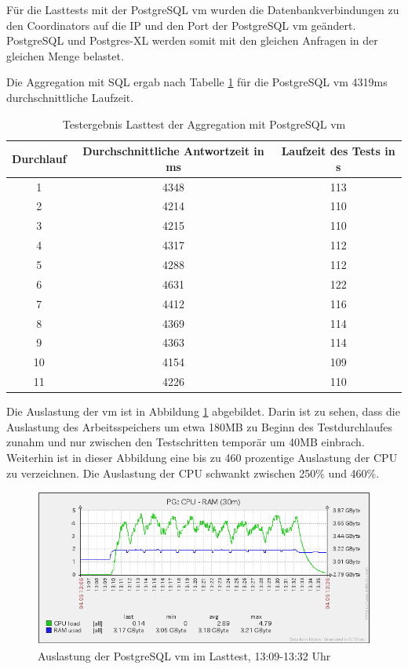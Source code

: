 Für die Lasttests mit der PostgreSQL \Gls{vm} wurden die Datenbankverbindungen zu den Coordinators auf die IP und den Port der PostgreSQL \Gls{vm} geändert.
PostgreSQL und Postgres-XL werden somit mit den gleichen Anfragen in der gleichen Menge belastet.

Die Aggregation mit SQL ergab nach Tabelle \ref{tbl:ergebnisseTest1PG} für die PostgreSQL \Gls{vm} 4319ms durchschnittliche Laufzeit.
\begin{table}[h!]
\centering
\begin{tabular}{c|c|c}
\textbf{Durchlauf} & \textbf{Durchschnittliche Antwortzeit in ms} & \textbf{Laufzeit des Tests in s} \\ \hline
1 & 4348 & 113 \\ \hline
2 & 4214 & 110 \\ \hline
3 & 4215 & 110 \\ \hline
4 & 4317 & 112 \\ \hline
5 & 4288 & 112 \\ \hline 
6 & 4631 & 122 \\ \hline
7 & 4412 & 116 \\ \hline
8 & 4369 & 114 \\ \hline
9 & 4363 & 114 \\ \hline 
10 & 4154 & 109 \\ \hline
11 & 4226 & 110 \\	
\end{tabular}
\caption[Testergebnis Lasttest der Aggregation mit PostgreSQL \Gls{vm}]{Testergebnis Lasttest der Aggregation mit PostgreSQL \Gls{vm}}
\label{tbl:ergebnisseTest1PG}
\end{table}

Die Auslastung der \Gls{vm} ist in Abbildung \ref{fig:auslastungTest1_pg} abgebildet.
Darin ist zu sehen, dass die Auslastung des Arbeitsspeichers um etwa 180MB zu Beginn des Testdurchlaufes zunahm und nur zwischen den Testschritten temporär um 40MB einbrach.
Weiterhin ist in dieser Abbildung eine bis zu 460 prozentige Auslastung der CPU zu verzeichnen.
Die Auslastung der CPU schwankt zwischen 250\%{} und 460\%{}.
\begin{figure}[h!]
\centering
\includegraphics[width=\textwidth]{Testergebnisse/jdbc_aggregation_pg_Testlauf.png}
\caption[Auslastung der PostgreSQL \Gls{vm} im ersten Lasttest]{Auslastung der PostgreSQL \Gls{vm} im Lasttest, 13:09-13:32 Uhr}
\label{fig:auslastungTest1_pg}
\end{figure}


